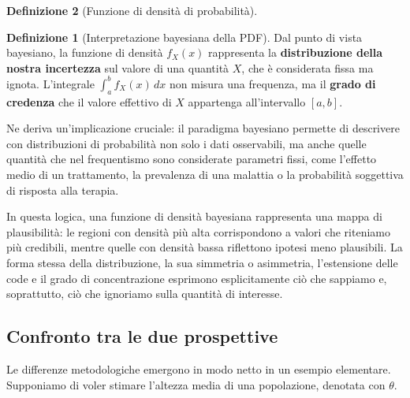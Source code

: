 \documentclass[
  italian,
  letterpaper,
  a4paper,
  11pt,
  open=any]{scrbook}
\theoremstyle{plain}
\theoremstyle{definition}
\theoremstyle{definition}
\newtheorem{definition}{Definizione}[chapter]
\theoremstyle{remark}
\begin{document}
\begin{definition}[Funzione di densità di
probabilità]
\begin{definition}[Interpretazione bayesiana della
PDF]
Dal punto di vista bayesiano, la funzione di densità \(f_X(x)\)
rappresenta la \textbf{distribuzione della nostra incertezza} sul valore
di una quantità \(X\), che è considerata fissa ma ignota. L'integrale
\(\int_a^b f_X(x)\,dx\) non misura una frequenza, ma il \textbf{grado di
credenza} che il valore effettivo di \(X\) appartenga all'intervallo
\([a,b]\).

\end{definition}

Ne deriva un'implicazione cruciale: il paradigma bayesiano permette di
descrivere con distribuzioni di probabilità non solo i dati osservabili,
ma anche quelle quantità che nel frequentismo sono considerate parametri
fissi, come l'effetto medio di un trattamento, la prevalenza di una
malattia o la probabilità soggettiva di risposta alla terapia.

In questa logica, una funzione di densità bayesiana rappresenta una
mappa di plausibilità: le regioni con densità più alta corrispondono a
valori che riteniamo più credibili, mentre quelle con densità bassa
riflettono ipotesi meno plausibili. La forma stessa della distribuzione,
la sua simmetria o asimmetria, l'estensione delle code e il grado di
concentrazione esprimono esplicitamente ciò che sappiamo e, soprattutto,
ciò che ignoriamo sulla quantità di interesse.

\subsection{Confronto tra le due
prospettive}\label{confronto-tra-le-due-prospettive}

Le differenze metodologiche emergono in modo netto in un esempio
elementare. Supponiamo di voler stimare l'altezza media di una
popolazione, denotata con \(\theta\).


\end{definition}
\end{document}
